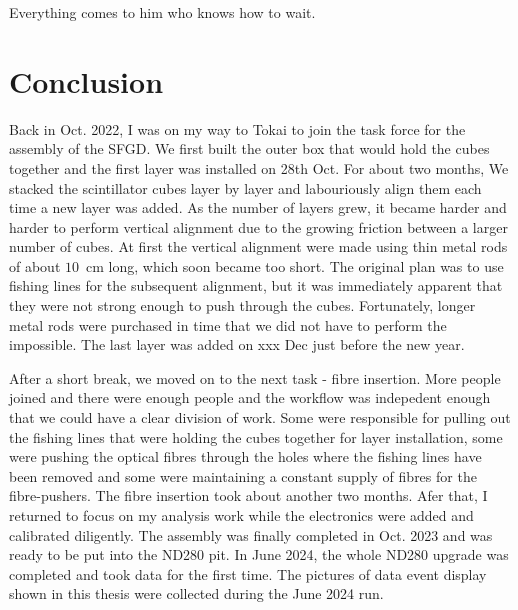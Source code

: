 \begin{savequote}[8cm]
Everything comes to him who knows how to wait.

\end{savequote}

\chapter{\label{ch:1-concl}Conclusion} 

\minitoc

Back in Oct. 2022, I was on my way to Tokai to join the task force for the assembly of the SFGD.
We first built the outer box that would hold the cubes together and the first layer was installed on 28th Oct.
For about two months, We stacked the scintillator cubes layer by layer and labouriously align them each time a new layer was added.
As the number of layers grew, it became harder and harder to perform vertical alignment due to the growing friction between a larger number of cubes.
At first the vertical alignment were made using thin metal rods of about $10$~cm long, which soon became too short.
The original plan was to use fishing lines for the subsequent alignment, but it was immediately apparent that they were not strong enough to push through the cubes.
Fortunately, longer metal rods were purchased in time that we did not have to perform the impossible.
The last layer was added on xxx Dec just before the new year.

After a short break, we moved on to the next task - fibre insertion.
More people joined and there were enough people and the workflow was indepedent enough that we could have a clear division of work.
Some were responsible for pulling out the fishing lines that were holding the cubes together for layer installation, some were pushing the optical fibres through the holes where the fishing lines have been removed and some were maintaining a constant supply of fibres for the fibre-pushers.
The fibre insertion took about another two months.
Afer that, I returned to focus on my analysis work while the electronics were added and calibrated diligently.
The assembly was finally completed in Oct. 2023 and was ready to be put into the ND280 pit.
In June 2024, the whole ND280 upgrade was completed and took data for the first time.
The pictures of data event display shown in this thesis were collected during the June 2024 run.

